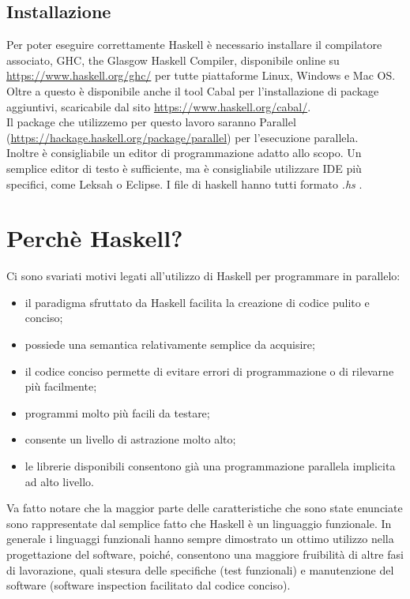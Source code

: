 \subsection{Installazione}
Per poter eseguire correttamente Haskell è necessario installare il compilatore associato, GHC, the Glasgow Haskell Compiler, disponibile online su \url{https://www.haskell.org/ghc/} per tutte piattaforme Linux, Windows e Mac OS.\\
Oltre a questo è disponibile anche il tool Cabal per l'installazione di package aggiuntivi, scaricabile dal sito \url{https://www.haskell.org/cabal/}.\\
Il package che utilizzemo per questo lavoro saranno Parallel (\url{https://hackage.haskell.org/package/parallel}) per l'esecuzione parallela.\\
Inoltre è consigliabile un editor di programmazione adatto allo scopo. Un semplice editor di testo è sufficiente, ma è consigliabile utilizzare IDE più specifici, come Leksah o Eclipse. I file di haskell hanno tutti formato \textit{.hs} .
\section{Perchè Haskell?}
Ci sono svariati motivi legati all'utilizzo di Haskell per programmare in parallelo:
\begin{itemize}
\item{il paradigma sfruttato da Haskell facilita la creazione di codice pulito e conciso;}
\item{possiede una semantica relativamente semplice da acquisire;}
\item{il codice conciso permette di evitare errori di programmazione o di rilevarne più facilmente;}
\item{programmi molto più facili da testare;}
\item{consente un livello di astrazione molto alto;}
\item{le librerie disponibili consentono già una programmazione parallela implicita ad alto livello.}
\end{itemize}
Va fatto notare che la maggior parte delle caratteristiche che sono state enunciate sono rappresentate dal semplice fatto che Haskell è un linguaggio funzionale. In generale i linguaggi funzionali hanno sempre dimostrato un ottimo utilizzo nella progettazione del software, poiché, consentono una maggiore fruibilità di altre fasi di lavorazione, quali stesura delle specifiche (test funzionali) e manutenzione del software (software inspection facilitato dal codice conciso).\\
